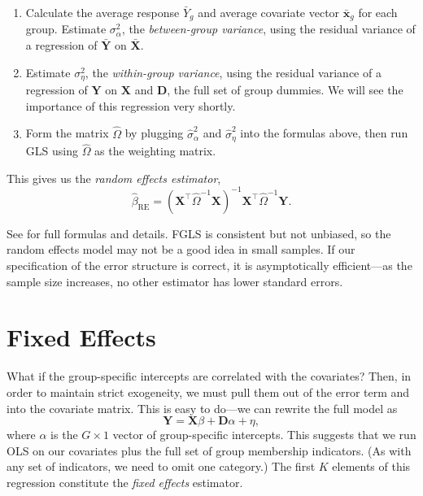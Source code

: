 \documentclass[12pt,oneside,openany]{book}
\begin{document}
\begin{enumerate}
\def\labelenumi{\arabic{enumi}.}
\item
  Calculate the average response \(\bar{Y}_g\) and average covariate
  vector \(\bar{\mathbf{x}}_g\) for each group. Estimate
  \(\sigma^2_\alpha\), the \emph{between-group variance}, using the
  residual variance of a regression of \(\bar{\mathbf{Y}}\) on
  \(\bar{\mathbf{X}}\).
\item
  Estimate \(\sigma^2_\eta\), the \emph{within-group variance}, using
  the residual variance of a regression of \(\mathbf{Y}\) on
  \(\mathbf{X}\) and \(\mathbf{D}\), the full set of group dummies. We
  will see the importance of this regression very shortly.
\item
  Form the matrix \(\hat{\Omega}\) by plugging \(\hat{\sigma}^2_\alpha\)
  and \(\hat{\sigma}^2_\eta\) into the formulas above, then run GLS
  using \(\hat{\Omega}\) as the weighting matrix.
\end{enumerate}

This gives us the \emph{random effects estimator}, \[
\hat{\beta}_{\text{RE}} = (\mathbf{X}^\top \hat{\Omega}^{-1} \mathbf{X})^{-1} \mathbf{X}^\top \hat{\Omega}^{-1} \mathbf{Y}.
\]

See \citet[392--395]{Johnston:1997um} for full formulas and details.
FGLS is consistent but not unbiased, so the random effects model may not
be a good idea in small samples. If our specification of the error
structure is correct, it is asymptotically efficient---as the sample
size increases, no other estimator has lower standard errors.

\section{Fixed Effects}\label{fixed-effects}

What if the group-specific intercepts are correlated with the
covariates? Then, in order to maintain strict exogeneity, we must pull
them out of the error term and into the covariate matrix. This is easy
to do---we can rewrite the full model as \[
\mathbf{Y} = \mathbf{X} \beta + \mathbf{D} \alpha + \eta,
\] where \(\alpha\) is the \(G \times 1\) vector of group-specific
intercepts. This suggests that we run OLS on our covariates plus the
full set of group membership indicators. (As with any set of indicators,
we need to omit one category.) The first \(K\) elements of this
regression constitute the \emph{fixed effects} estimator.
\end{document}
